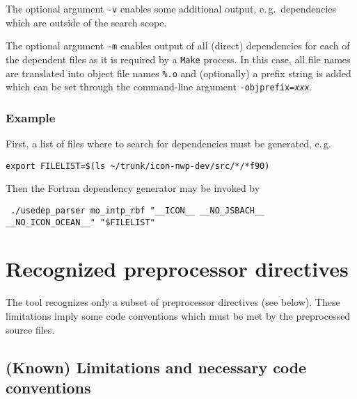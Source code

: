 \documentclass[DIV16]{scrartcl}
\begin{document}
The optional argument \texttt{-v} enables some additional output,
e.\,g.\ dependencies which are outside of the search scope.

The optional argument \texttt{-m} enables output of all (direct)
dependencies for each of the dependent files as it is required by a
\texttt{Make} process. In this case, all file names are translated
into object file names \texttt{\%.o} and (optionally) a prefix string
is added which can be set through the command-line argument
\texttt{-objprefix=\textit{xxx}}.


\subsubsection{Example}

First, a list of files where to search for dependencies must be generated, e.\,g.
\begin{verbatim}
export FILELIST=$(ls ~/trunk/icon-nwp-dev/src/*/*f90)
\end{verbatim}
Then the Fortran dependency generator may be invoked by
\begin{verbatim}
 ./usedep_parser mo_intp_rbf "__ICON__ __NO_JSBACH__ __NO_ICON_OCEAN__" "$FILELIST"
\end{verbatim}


\section{Recognized preprocessor directives}

The tool recognizes only a subset of preprocessor directives (see
below).  These limitations imply some code conventions which must be
met by the preprocessed source files.


\subsection{(Known) Limitations and necessary code conventions}
\end{document}
